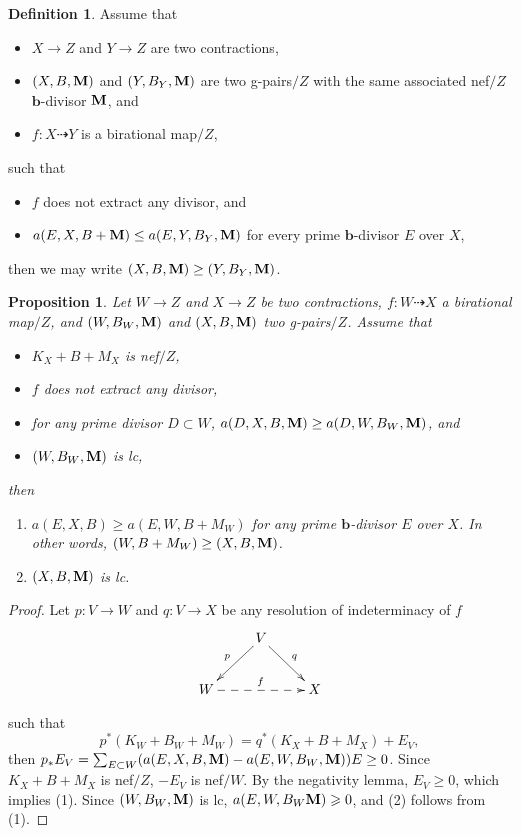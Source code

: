 \documentclass[11pt]{amsart}
\numberwithin{equation}{section}
\newcommand{\bb}{\bm{b}}
\newcommand{\Mm}{{\bf{M}}}
\newtheorem{prop}[thm]{Proposition}
\theoremstyle{definition}
\newtheorem{defn}[thm]{Definition}
\theoremstyle{definition}
\theoremstyle{definition}
\begin{document}
\begin{defn}
Assume that
\begin{itemize}
    \item $X\rightarrow Z$ and $Y\rightarrow Z$ are two contractions,
    \item $(X,B,\Mm)$ and $(Y,B_Y,\Mm)$ are two g-pairs$/Z$ with the same associated nef$/Z$ $\bb$-divisor $\Mm$, and
    \item $f: X\dashrightarrow Y$ is a birational map$/Z$,
\end{itemize}
such that
\begin{itemize}
    \item $f$ does not extract any divisor, and
    \item $a(E,X,B+\Mm)\leq a(E,Y,B_Y,\Mm)$ for every prime $\bb$-divisor $E$ over $X$,
\end{itemize}
then we may write $(X,B,\Mm)\geq (Y,B_Y,\Mm)$.
\end{defn}

\begin{prop}\label{prop: g lc prop} 
Let $W\rightarrow Z$ and $X\rightarrow Z$ be two contractions, $f:W\dashrightarrow X$ a birational map$/Z$, and $(W,B_W,\Mm)$ and $(X,B,\Mm)$ two g-pairs$/Z$. Assume that
\begin{itemize}
    \item $K_X+B+M_X$ is nef$/Z$,
    \item $f$ does not extract any divisor,
    \item for any prime divisor $D\subset W$, $a(D,X,B,\Mm )\geq a(D,W,B_W,\Mm)$, and
    \item $(W,B_W,\Mm)$ is lc,
\end{itemize}
then
\begin{enumerate}
    \item $a(E,X,B)\geq a(E,W,B+M_W)$ for any prime $\bb$-divisor $E$ over $X$. In other words, $(W,B+M_W)\geq (X,B,\Mm)$.
    \item $(X,B,\Mm)$ is lc.
\end{enumerate}
\end{prop}

\begin{proof}
Let 
$p: V\rightarrow W$ and $q: V\rightarrow X$ be any resolution of indeterminacy of $f$ 
\[
  \xymatrix{
 & V\ar@{->}[dl]_{p}\ar@{->}[dr]^{q}& \\
      W\ar@{-->}[rr]^{f}   &  & X \\
    }
\]


such that
$$p^*(K_W+B_W+M_W)=q^*(K_X+B+M_X)+E_V,$$
then $p_*E_V=\sum_{E\subset W}(a(E,X,B,\Mm)-a(E,W,B_W,\Mm))E\geq 0$. Since $K_X+B+M_X$ is nef$/Z$, $-E_V$ is nef$/W$. By the negativity lemma, $E_V\geq 0$, which implies (1). 
Since $(W,B_W,\Mm)$ is lc, $a(E,W,B_W\Mm) \geqslant 0 $, and (2) follows from (1).  
\end{proof}
\end{document}
